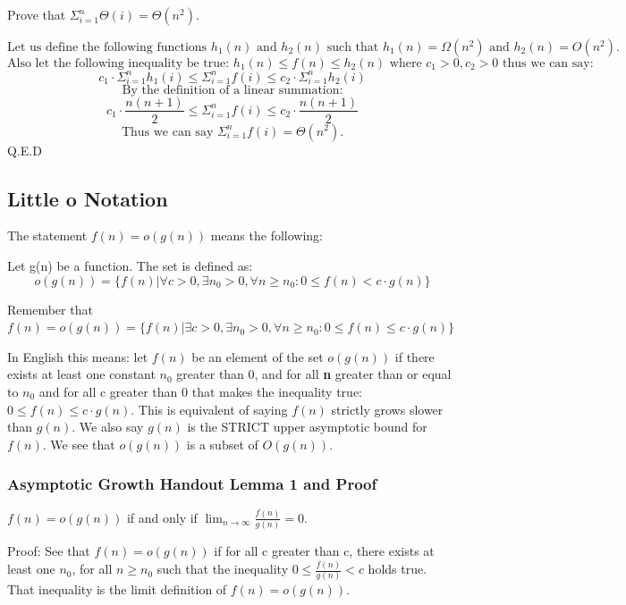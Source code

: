 \documentclass{article}
\begin{document}
Prove that $\Sigma_{i=1}^{n} \Theta(i) = \Theta(n^2)$. 

$$\text{Let us define the following functions } h_1(n) \text{ and } h_2(n) \text{ such that } h_1(n) = \Omega(n^2) \text{ and } h_2(n) = O(n^2).$$
$$\text{Also let the following inequality be true: } h_1(n) \leq f(n) \leq h_2(n) \text{ where } c_1 > 0, c_2 > 0\text{ thus we can say:}$$
$$c_1 \cdot \Sigma_{i=1}^{n} h_1(i) \leq \Sigma_{i=1}^{n} f(i) \leq c_2 \cdot \Sigma_{i=1}^{n} h_2(i) $$
$$\text{By the definition of a linear summation:}$$
$$c_1 \cdot \frac{n(n+1)}{2} \leq \Sigma_{i=1}^{n} f(i) \leq c_2 \cdot \frac{n(n+1)}{2} $$
$$\text{Thus we can say } \Sigma_{i=1}^{n} f(i) = \Theta(n^2).$$
Q.E.D

\subsection{Little o Notation}

The statement $f(n) = o(g(n)) $ means the following:

Let g(n) be a function. The set is defined as:
$$ o(g(n)) = \{ f(n) | \forall c > 0 , \exists n_0 > 0, \forall n \geq n_0 : 0 \leq f(n) < c \cdot g(n) \}$$ 

Remember that $f(n) = o(g(n)) = \{ f(n) | \exists c > 0 , \exists n_0 > 0, \forall n \geq n_0 : 0 \leq f(n) \leq c \cdot g(n) \}$

In English this means: let $f(n)$ be an element of the set $o(g(n))$ if there exists at least one constant \textbf{$n_0$} greater than 0, and for all \textbf{n} greater than or equal to \textbf{$n_0$} and for all c greater than 0 that makes the inequality true: $0 \leq f(n) \leq c \cdot g(n)$. This is equivalent of saying $f(n)$ strictly grows slower than $g(n)$. We also say $g(n)$ is the STRICT upper asymptotic bound for $f(n)$. We see that $o(g(n))$ is a subset of $O(g(n))$.

\subsubsection{Asymptotic Growth Handout Lemma 1 and Proof}

$f(n) = o(g(n))$ if and only if $\lim_{n \rightarrow \infty} \frac{f(n)}{g(n)} = 0 $.

Proof:
See that $f(n) = o(g(n))$ if for all c greater than c, there exists at least one $n_0$, for all $n \geq n_0$ such that the inequality $0 \leq \frac{f(n)}{g(n)} < c$ holds true. That inequality is the limit definition of $f(n) = o(g(n))$.
\end{document}

